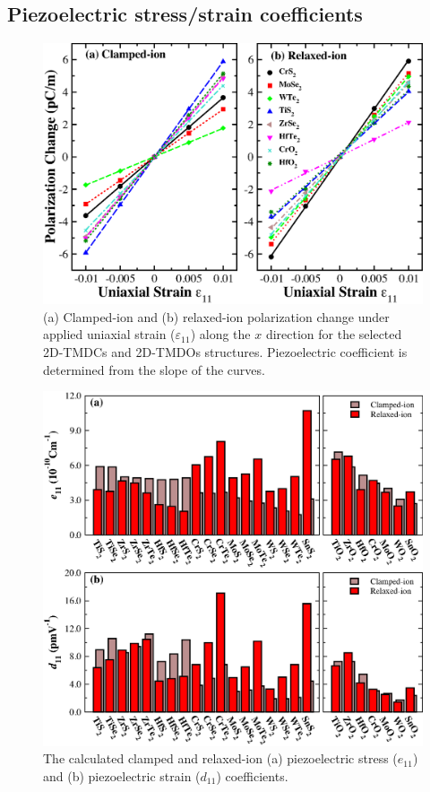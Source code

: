 \subsection{Piezoelectric stress/strain coefficients}\label{piezo}

\begin{figure}[htbp]
\centering
\includegraphics[width=0.8\linewidth]{polariz.eps}
\caption{\label{fig:polariz} (a) Clamped-ion and (b) relaxed-ion polarization change under applied uniaxial strain ($\varepsilon_{11}$) along the $x$ direction for the selected 2D-TMDCs and 2D-TMDOs structures. Piezoelectric coefficient is determined from the slope of the curves.}
\end{figure}

\begin{figure}[t]
\centering
\includegraphics[width=0.8\linewidth]{piezo_res.eps}
\caption{\label{fig:piezo_res}The calculated clamped and relaxed-ion (a) piezoelectric stress ($e_{11}$)  and (b) piezoelectric strain ($d_{11}$) coefficients.}
\end{figure}


